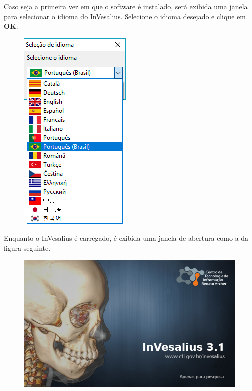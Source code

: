 \hspace{.2cm}

Caso seja a primeira vez em que o software é instalado, será exibida uma janela
para selecionar o idioma do InVesalius. Selecione o idioma desejado e clique em
\textbf{OK}.

\begin{figure}[!htb]
\centering
\includegraphics[scale=0.7]{../user_guide_figures/invesalius_screen/invesalius_language_select_pt.png}
\end{figure}

\newpage

Enquanto o InVesalius é carregado, é exibida uma janela de abertura como a da figura
seguinte.

\begin{figure}[!htb]
\centering
\includegraphics[scale=0.4]{../user_guide_figures/icons/splash_pt.png}
\end{figure}

